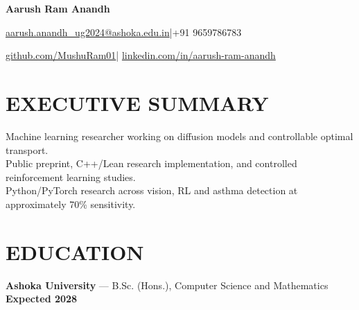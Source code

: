 \documentclass[10pt,a4paper]{article}
\begin{document}
{\LARGE\bfseries Aarush Ram Anandh}\par\vspace{4pt}
\href{mailto:aarush.anandh_ug2024@ashoka.edu.in}{aarush.anandh\_ug2024@ashoka.edu.in}\quad|\quad +91 9659786783\par\vspace{2pt}
\href{https://github.com/MushuRam01}{github.com/MushuRam01}\quad|\quad
\href{https://www.linkedin.com/in/aarush-ram-anandh/}{linkedin.com/in/aarush-ram-anandh}\par

\section{EXECUTIVE SUMMARY}
Machine learning researcher working on diffusion models and controllable optimal transport.\\
Public preprint, C++/Lean research implementation, and controlled reinforcement learning studies.\\
Python/PyTorch research across vision, RL and asthma detection at approximately 70\% sensitivity.\par
\section{EDUCATION}
\textbf{Ashoka University} --- B.Sc. (Hons.), Computer Science and Mathematics \hfill \textbf{Expected 2028}
\end{document}
